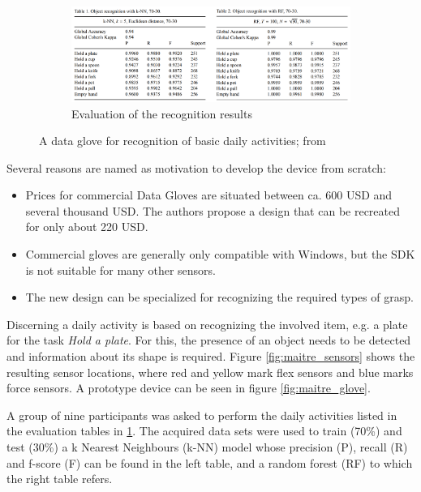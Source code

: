 \documentclass[hyperref, bachelorofscience]{cgvpub}
\begin{document}
\begin{figure}[b!]
	\vspace{.5cm}
	\begin{subfigure}{\linewidth}
		\includegraphics[width=\linewidth]{../pics/maitre_results}
		\caption{Evaluation of the recognition results}
		\label{fig:maitre_results}
	\end{subfigure}
	\caption[A data glove for recognition of basic daily activities]{A data glove for recognition of basic daily activities; from \cite{maitre19}}
	\label{fig:maitre}
\end{figure}

Several reasons are named as motivation to develop the device from scratch:
\vspace{.3cm}
\begin{itemize}
	\item Prices for commercial Data Gloves are situated between ca. 600 USD and several thousand USD. The authors propose a design that can be recreated for only about 220 USD.
	\item Commercial gloves are generally only compatible with Windows, but the SDK is not suitable for many other sensors.
	\item The new design can be specialized for recognizing the required types of grasp.
\end{itemize}

Discerning a daily activity is based on recognizing the involved item, e.g. a plate for the task \emph{Hold a plate}. For this, the presence of an object needs to be detected and information about its shape is required. Figure \ref{fig:maitre_sensors} shows the resulting sensor locations, where red and yellow mark flex sensors and blue marks force sensors. A prototype device can be seen in figure \ref{fig:maitre_glove}. 

A group of nine participants was asked to perform the daily activities listed in the evaluation tables in \ref{fig:maitre_results}. The acquired data sets were used to train (70\%) and test (30\%) a k Nearest Neighbours (k-NN) model whose precision (P), recall (R) and f-score (F) can be found in the left table, and a random forest (RF) to which the right table refers.
\end{document}
